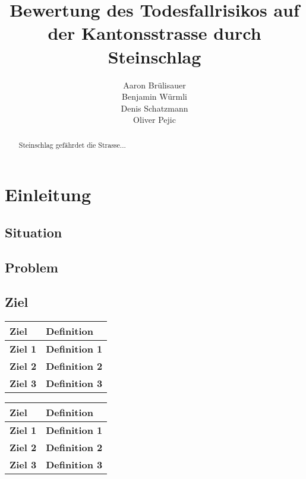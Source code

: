 \documentclass[a4paper,10pt]{report}
\title{Bewertung des Todesfallrisikos auf der Kantonsstrasse durch Steinschlag}
\author{Aaron Brülisauer\\Benjamin Würmli\\Denis Schatzmann\\Oliver Pejic}
\begin{document}
    \maketitle

    \begin{abstract}
        Steinschlag gefährdet die Strasse...
    \end{abstract}

    \tableofcontents


    \chapter{Einleitung}


    \section{Situation}


    \section{Problem}


    \section{Ziel}
    \begin{table}
        \begin{tabular}{|l|l|}
            \hline
            \textbf{Ziel}   & \textbf{Definition}   \\ \hline
            \textbf{Ziel 1} & \textbf{Definition 1} \\ \hline
            \textbf{Ziel 2} & \textbf{Definition 2} \\ \hline
            \textbf{Ziel 3} & \textbf{Definition 3} \\ \hline

        \end{tabular}
    \end{table}

    \begin{table}
        \begin{tabular}{|l|l|}
            \hline
            \textbf{Ziel}   & \textbf{Definition}   \\ \hline
            \textbf{Ziel 1} & \textbf{Definition 1} \\ \hline
            \textbf{Ziel 2} & \textbf{Definition 2} \\ \hline
            \textbf{Ziel 3} & \textbf{Definition 3} \\ \hline

        \end{tabular}
    \end{table}
\end{document}
